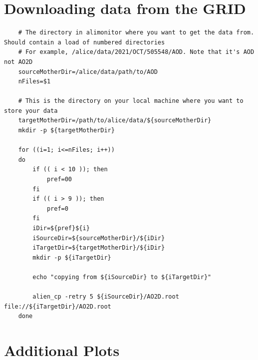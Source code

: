 \section{Downloading data from the GRID}\label{apx:Downloading_Data}
\begin{verbatim}
    # The directory in alimonitor where you want to get the data from. Should contain a load of numbered directories
    # For example, /alice/data/2021/OCT/505548/AOD. Note that it's AOD not AO2D
    sourceMotherDir=/alice/data/path/to/AOD
    nFiles=$1

    # This is the directory on your local machine where you want to store your data
    targetMotherDir=/path/to/alice/data/${sourceMotherDir}
    mkdir -p ${targetMotherDir}

    for ((i=1; i<=nFiles; i++))
    do
        if (( i < 10 )); then
            pref=00
        fi
        if (( i > 9 )); then
            pref=0
        fi
        iDir=${pref}${i}
        iSourceDir=${sourceMotherDir}/${iDir}
        iTargetDir=${targetMotherDir}/${iDir}
        mkdir -p ${iTargetDir}

        echo "copying from ${iSourceDir} to ${iTargetDir}" 
        
        alien_cp -retry 5 ${iSourceDir}/AO2D.root file://${iTargetDir}/AO2D.root
    done
\end{verbatim}

\newpage
\section{Additional Plots}\label{apx:Additional_Plots}

